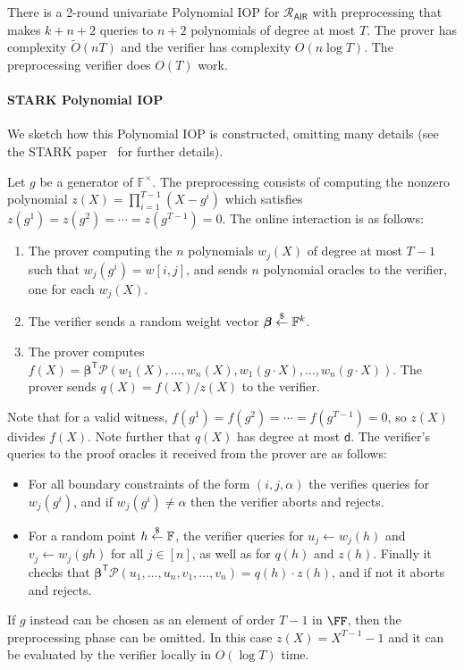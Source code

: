 \begin{theorem}
There is a 2-round univariate Polynomial IOP for $\mathcal{R}_\mathsf{AIR}$ with preprocessing that makes $k+n+2$ queries to $n+2$ polynomials of degree at most $T$. The prover has complexity $\tilde{O}(nT)$ and the verifier has complexity $O(n \log T)$. The preprocessing verifier does $O(T)$ work.
\end{theorem}


\paragraph{\textsf{STARK} Polynomial IOP} We sketch how this Polynomial IOP is constructed, omitting many details (see the \textsf{STARK} paper~\cite{C:BBHR19} for further details).

Let $g$ be a generator of $\mathbb{F}^\times$. The preprocessing consists of computing the nonzero polynomial $z(X) = \prod_{i=1}^{T-1} (X-g^i)$ which satisfies $z(g^1) = z(g^2) = \cdots = z(g^{T-1}) = 0$. The online interaction is as follows: 
\begin{enumerate} 
\item The prover computing the $n$ polynomials $w_j(X)$ of degree at most $T-1$ such that $w_j(g^i) = w[i,j]$, and sends $n$ polynomial oracles to the verifier, one for each $w_j(X)$. 
\item The verifier sends a random weight vector $\boldsymbol{\beta} \overset{\$}{\gets} \mathbb{F}^k$.
\item  The prover computes $f(X) = \boldsymbol{\beta}^\mathsf{T} \boldsymbol{\mathcal{P}}(w_1(X), \ldots, w_n(X), w_1(g \cdot X), \ldots, w_n(g \cdot X))$. The prover sends $q(X) = f(X)/z(X)$ to the verifier.

\end{enumerate}

  Note that for a valid witness, $f(g^1) = f(g^2) = \cdots = f(g^{T-1}) = 0$, so $z(X)$ divides $f(X)$. Note further that $q(X)$ has degree at most $\mathsf{d}$. The verifier's queries to the proof oracles it received from the prover are as follows:
\begin{itemize}
    \item For all boundary constraints of the form $(i, j, \alpha)$ the verifies queries for $w_j(g^i)$, and if $w_j(g^i) \neq \alpha$ then the verifier aborts and rejects. %
    \item For a random point $h \overset{\$}{\gets} \mathbb{F}$, the verifier queries for $u_j \leftarrow w_j(h)$ and $v_j \leftarrow w_j(gh)$ for all $j \in [n]$, as well as for $q(h)$ and $z(h)$. %
    Finally it checks that $\boldsymbol{\beta}^\mathsf{T} \boldsymbol{\mathcal{P}}(u_1, \ldots, u_n, v_1, \ldots, v_n) = q(h) \cdot z(h)$, and if not it aborts and rejects.
\end{itemize}
If $g$ instead can be chosen as an element of order $T-1$ in $\FF$, then the preprocessing phase can be omitted. In this case $z(X) = X^{T-1} - 1$ and it can be evaluated by the verifier locally in $O(\log T)$ time.
\fi

%


